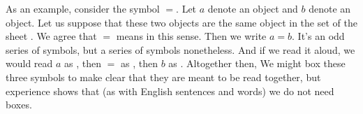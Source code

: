 %
%
%
%
%
%
%
%
%


As an example, consider the symbol $=$.
Let $a$ denote an object and $b$ denote an object.
Let us suppose that these two objects are the same object in the set of the sheet .
We agree that $=$ means  in this sense.
Then we write $a = b$.
It's an odd series of symbols, but a series of symbols nonetheless.
And if we read it aloud, we would read $a$ as , then $=$ as , then $b$ as .
Altogether then, 
We might box these three symbols  to make clear that they are meant to be read together, but experience shows that (as with English sentences and words) we do not need boxes.

